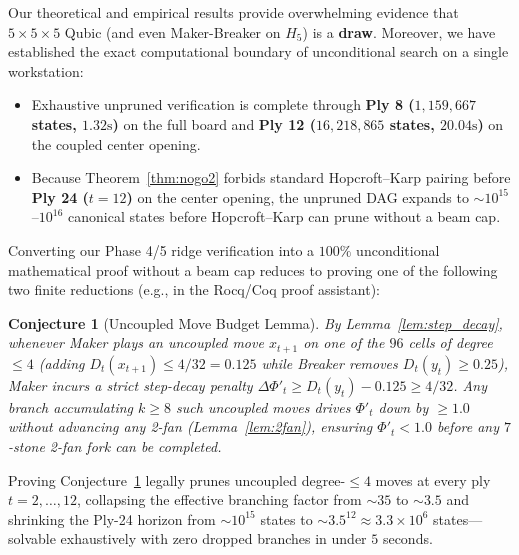 \documentclass[11pt,a4paper]{article}
\newtheorem{conjecture}[theorem]{Conjecture}
\theoremstyle{definition}
\theoremstyle{remark}
\begin{document}
Our theoretical and empirical results provide overwhelming evidence that $5 \times 5 \times 5$ Qubic (and even Maker-Breaker on $H_5$) is a \textbf{draw}. Moreover, we have established the exact computational boundary of unconditional search on a single workstation:
\begin{itemize}[noitemsep]
    \item Exhaustive unpruned verification is complete through \textbf{Ply 8 ($1,159,667$ states, $1.32\text{s}$)} on the full board and \textbf{Ply 12 ($16,218,865$ states, $20.04\text{s}$)} on the coupled center opening.
    \item Because Theorem~\ref{thm:nogo2} forbids standard Hopcroft--Karp pairing before \textbf{Ply 24 ($t = 12$)} on the center opening, the unpruned DAG expands to $\sim 10^{15}$--$10^{16}$ canonical states before Hopcroft--Karp can prune without a beam cap.
\end{itemize}

Converting our Phase 4/5 ridge verification into a $100\%$ unconditional mathematical proof without a beam cap reduces to proving one of the following two finite reductions (e.g., in the Rocq/Coq proof assistant):
\begin{conjecture}[Uncoupled Move Budget Lemma]
\label{conj:budget}
By Lemma~\ref{lem:step_decay}, whenever Maker plays an uncoupled move $x_{t+1}$ on one of the $96$ cells of degree $\le 4$ (adding $D_t(x_{t+1}) \le 4/32 = 0.125$ while Breaker removes $D_t(y_t) \ge 0.25$), Maker incurs a strict step-decay penalty $\Delta \Phi'_t \ge D_t(y_t) - 0.125 \ge 4/32$. Any branch accumulating $k \ge 8$ such uncoupled moves drives $\Phi'_t$ down by $\ge 1.0$ without advancing any 2-fan (Lemma~\ref{lem:2fan}), ensuring $\Phi'_t < 1.0$ before any $7$-stone 2-fan fork can be completed.
\end{conjecture}
Proving Conjecture~\ref{conj:budget} legally prunes uncoupled degree-$\le 4$ moves at every ply $t = 2,\dots,12$, collapsing the effective branching factor from $\sim 35$ to $\sim 3.5$ and shrinking the Ply-24 horizon from $\sim 10^{15}$ states to $\sim 3.5^{12} \approx 3.3 \times 10^6$ states---solvable exhaustively with zero dropped branches in under $5$ seconds.
\end{document}

